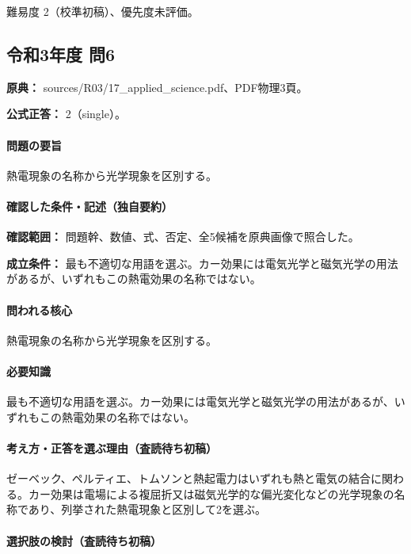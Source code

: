 \par 難易度 2（校準初稿）、優先度未評価。

\subsection{令和3年度 問6}
\label{q:r03-reg-applied-06}

\noindent\textbf{原典：} sources/R03/17\_applied\_science.pdf、PDF物理3頁。

\textbf{公式正答：} 2（single）。

\paragraph{問題の要旨} 熱電現象の名称から光学現象を区別する。

\paragraph{確認した条件・記述（独自要約）}\mbox{}\par

\noindent\textbf{確認範囲：} 問題幹、数値、式、否定、全5候補を原典画像で照合した。\par

\noindent\textbf{成立条件：} 最も不適切な用語を選ぶ。カー効果には電気光学と磁気光学の用法があるが、いずれもこの熱電効果の名称ではない。\par

\paragraph{問われる核心} 熱電現象の名称から光学現象を区別する。

\paragraph{必要知識} 最も不適切な用語を選ぶ。カー効果には電気光学と磁気光学の用法があるが、いずれもこの熱電効果の名称ではない。

\paragraph{考え方・正答を選ぶ理由（査読待ち初稿）} ゼーベック、ペルティエ、トムソンと熱起電力はいずれも熱と電気の結合に関わる。カー効果は電場による複屈折又は磁気光学的な偏光変化などの光学現象の名称であり、列挙された熱電現象と区別して2を選ぶ。

\paragraph{選択肢の検討（査読待ち初稿）}\mbox{}\par


